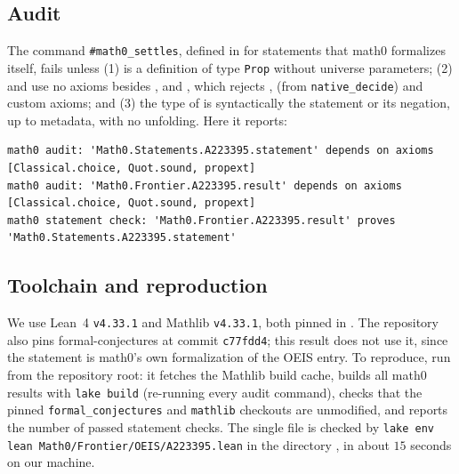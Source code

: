 \documentclass[11pt]{amsart}
\theoremstyle{plain}
\theoremstyle{definition}
\begin{document}
\subsection*{Audit}
The command \texttt{\#math0\_settles}, defined in  for statements that math0 formalizes itself, fails unless (1)  is a definition of type \texttt{Prop} without universe parameters; (2)  and  use no axioms besides ,  and , which rejects ,  (from \texttt{native\_decide}) and custom axioms; and (3) the type of  is syntactically the statement or its negation, up to metadata, with no unfolding. Here it reports:
\begin{lstlisting}[basicstyle=\ttfamily\scriptsize]
math0 audit: 'Math0.Statements.A223395.statement' depends on axioms [Classical.choice, Quot.sound, propext]
math0 audit: 'Math0.Frontier.A223395.result' depends on axioms [Classical.choice, Quot.sound, propext]
math0 statement check: 'Math0.Frontier.A223395.result' proves 'Math0.Statements.A223395.statement'
\end{lstlisting}

\subsection*{Toolchain and reproduction}
We use Lean~4 \cite{Lean4} \texttt{v4.33.1} and Mathlib \cite{Mathlib} \texttt{v4.33.1}, both pinned in . The repository also pins formal-conjectures \cite{FC} at commit \texttt{c77fdd4}; this result does not use it, since the statement is math0's own formalization of the OEIS entry.
To reproduce, run  from the repository root: it fetches the Mathlib build cache, builds all math0 results with \texttt{lake build} (re-running every audit command), checks that the pinned \texttt{formal\_conjectures} and \texttt{mathlib} checkouts are unmodified, and reports the number of passed statement checks. The single file is checked by \texttt{lake env lean Math0/Frontier/OEIS/A223395.lean} in the directory , in about $15$ seconds on our machine.
\end{document}
